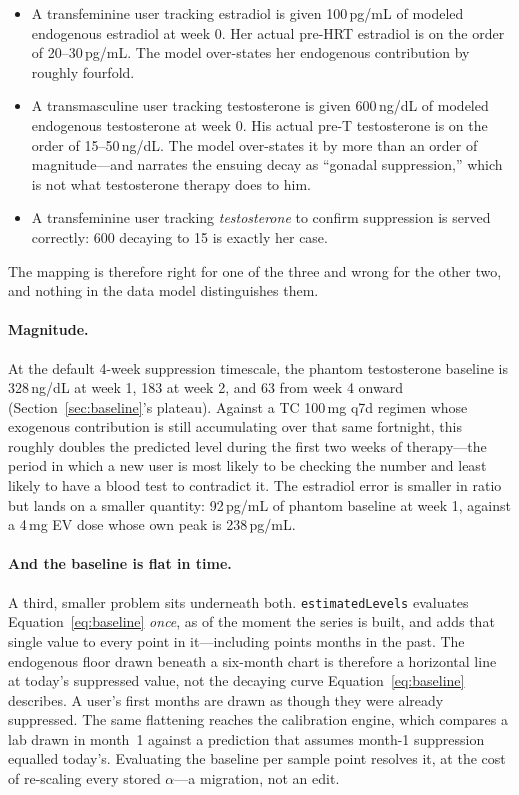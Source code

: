 \documentclass[11pt,a4paper]{article}
\newcommand{\code}[1]{\texttt{\small #1}}
\begin{document}
\begin{itemize}[nosep,leftmargin=1.4em]
\item A transfeminine user tracking estradiol is given 100\,pg/mL of modeled
  endogenous estradiol at week 0. Her actual pre-HRT estradiol is on the
  order of 20--30\,pg/mL. The model over-states her endogenous contribution
  by roughly fourfold.
\item A transmasculine user tracking testosterone is given 600\,ng/dL of
  modeled endogenous testosterone at week 0. His actual pre-T testosterone
  is on the order of 15--50\,ng/dL. The model over-states it by more than an
  order of magnitude---and narrates the ensuing decay as ``gonadal
  suppression,'' which is not what testosterone therapy does to him.
\item A transfeminine user tracking \emph{testosterone} to confirm
  suppression is served correctly: 600 decaying to 15 is exactly her case.
\end{itemize}

The mapping is therefore right for one of the three and wrong for the other
two, and nothing in the data model distinguishes them.

\paragraph{Magnitude.} At the default 4-week suppression timescale, the
phantom testosterone baseline is 328\,ng/dL at week 1, 183 at week 2, and
63 from week 4 onward (Section~\ref{sec:baseline}'s plateau). Against a
TC 100\,mg q7d regimen whose exogenous contribution is still accumulating
over that same fortnight, this roughly doubles the predicted level during
the first two weeks of therapy---the period in which a new user is most
likely to be checking the number and least likely to have a blood test to
contradict it. The estradiol error is smaller in ratio but lands on a
smaller quantity: 92\,pg/mL of phantom baseline at week 1, against a
4\,mg EV dose whose own peak is 238\,pg/mL.

\paragraph{And the baseline is flat in time.} A third, smaller problem sits
underneath both. \code{estimatedLevels} evaluates
Equation~\ref{eq:baseline} \emph{once}, as of the moment the series is
built, and adds that single value to every point in it---including points
months in the past. The endogenous floor drawn beneath a six-month chart is
therefore a horizontal line at today's suppressed value, not the decaying
curve Equation~\ref{eq:baseline} describes. A user's first months are drawn
as though they were already suppressed. The same flattening reaches the
calibration engine, which compares a lab drawn in month~1 against a
prediction that assumes month-1 suppression equalled today's. Evaluating the
baseline per sample point resolves it, at the cost of re-scaling every
stored $\alpha$---a migration, not an edit.
\end{document}
